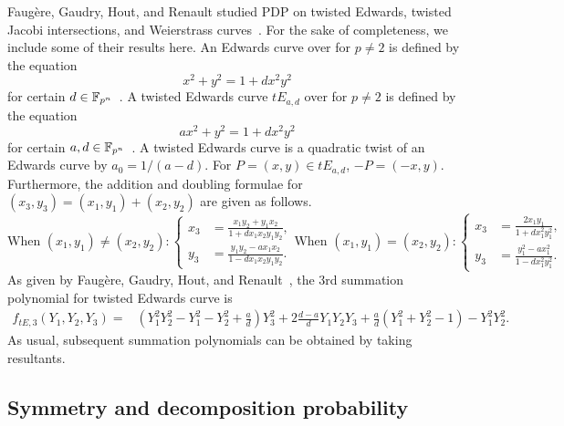 Faug\`ere, Gaudry, Hout, and Renault studied PDP on twisted Edwards,
twisted Jacobi intersections, and Weierstrass
curves~\cite{DBLP:journals/joc/FaugereGHR14}.
%
For the sake of completeness, we include some of their results here.
%
An Edwards curve over  for $p\neq 2$ is defined by the
equation \begin{equation*}
  x^2+y^2=1+dx^2y^2 \label{eq:edwards-curve} \end{equation*} for
certain $d\in\mathbb F_{p^n}$~\cite{DBLP:journals/iacr/BernsteinL07}.
%
A twisted Edwards curve $tE_{a,d}$ over  for $p\neq 2$ is
defined by the equation \begin{equation*}
  ax^2+y^2=1+dx^2y^2 \label{eq:twisted-edwards-curve} \end{equation*}
for certain $a,d\in\mathbb F_{p^n}$~\cite{DBLP:journals/iacr/BernsteinBJLP08}.
%
A twisted Edwards curve is a quadratic twist of an Edwards curve by
$a_0=1/(a-d)$.
%
For $P=(x,y)\in tE_{a,d}$, $-P=(-x,y)$.
%
Furthermore, the addition and doubling formulae for
$(x_3,y_3)=(x_1,y_1)+(x_2,y_2)$ are given as follows.
%
\[ \text{When }(x_1,y_1)\neq (x_2,y_2):\left\{\begin{aligned}
      x_3 & = \frac{x_1y_2 + y_1x_2}{1 + dx_1x_2y_1y_2}, \\
      y_3 & = \frac{y_1y_2 - ax_1x_2}{1 - dx_1x_2y_1y_2}.
    \end{aligned}\right. \text{When
  }(x_1,y_1)=(x_2,y_2):\left\{\begin{aligned}
      x_3 & = \frac{2x_1y_1}{1 + dx_1^2y_1^2}, \\
      y_3 & = \frac{y_1^2 - ax_1^2}{1 - dx_1^2y_1^2}.
    \end{aligned}\right. \]
%
As given by Faug\`ere, Gaudry, Hout, and
Renault~\cite{DBLP:journals/joc/FaugereGHR14}, the 3rd summation
polynomial for twisted Edwards curve is
%
\begin{align*}
  f_{tE, 3}(Y_1,Y_2,Y_3) = & \left(Y_1^2Y_2^2 - Y_1^2 - Y_2^2 +
                             \frac{a}{d}\right)Y_3^2  +
                             2\frac{d-a}{d}Y_1Y_2Y_3 +
                             \frac{a}{d}\left(Y_1^2 + Y_2^2 - 1\right)
                             - Y_1^2Y_2^2.
\end{align*}
%
As usual, subsequent summation polynomials can be obtained by taking
resultants.



\subsection{Symmetry and decomposition probability}
\label{sec:symmetry-decomposition-probability}


